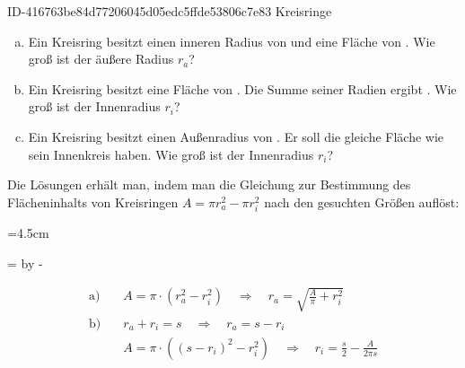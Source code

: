 \begin{exercise}
      {ID-416763be84d77206045d05edc5ffde53806c7e83}
      {Kreisringe}
  \ifproblem\problem
    \begin{enumerate}[a)]
      \item Ein Kreisring besitzt einen inneren Radius von  und eine
            Fläche von . Wie groß ist der äußere Radius $r_{a}$?
      \item Ein Kreisring besitzt eine Fläche von . Die Summe
            seiner Radien ergibt . Wie groß ist der Innenradius
            $r_{i}$?
      \item Ein Kreisring besitzt einen Außenradius von . Er soll
            die gleiche Fläche wie sein Innenkreis haben. Wie groß ist der
            Innenradius $r_{i}$?
    \end{enumerate}
  \fi
  \ifoutline\outline
    Die Lösungen erhält man, indem man die Gleichung zur Bestimmung des
    Flächeninhalts von Kreisringen $A=\pi r_a^2-\pi r_i^2$ nach den
    gesuchten Größen auflöst:\par
    \begingroup
      =4.5cm%
      \begin{minipage}{\dimen1}%
      \end{minipage}%
      =\linewidth%
      \advance{} by -%
      \begin{minipage}{\dimen2}%
        \setlength{\abovedisplayskip}{0pt}%
        \begin{equation*}
          \begin{split}
            \text{a)}&\quad
            A=\pi\cdot\left(r_a^2-r_i^2\right)
            \quad\Rightarrow\quad
            r_a=\sqrt{\frac{A}{\pi}+r_i^2}
            \\[2ex]
            \text{b)}&\quad
            r_a+r_i=s
            \quad\Rightarrow\quad
            r_a=s-r_i
            \\
            \text{~}&\quad
            A=\pi\cdot\left((s-r_i)^2-r_i^2\right)
            \quad\Rightarrow\quad
            r_i=\frac{s}{2}-\frac{A}{2\pi s}

\end{split}
\end{equation*}
\end{minipage}
\end{exercise}

